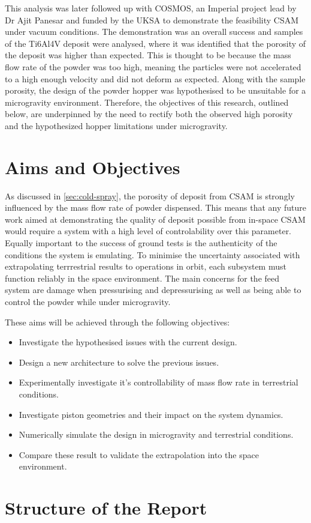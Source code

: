 This analysis was later followed up with COSMOS, an Imperial project lead by Dr Ajit Panesar and funded by the UKSA to demonstrate the feasibility CSAM under vacuum conditions. The demonstration was an overall success and samples of the Ti6Al4V deposit were analysed, where it was identified that the porosity of the deposit was higher than expected. This is thought to be because the mass flow rate of the powder was too high, meaning the particles were not accelerated to a high enough velocity and did not deform as expected. Along with the sample porosity, the design of the powder hopper was hypothesised to be unsuitable for a microgravity environment. Therefore, the objectives of this research, outlined below, are underpinned by the need to rectify both the observed high porosity and the hypothesized hopper limitations under microgravity.

\section{Aims and Objectives}
As discussed in \autoref{sec:cold-spray}, the porosity of deposit from CSAM is strongly influenced by the mass flow rate of powder dispensed. This means that any future work aimed at demonstrating the quality of deposit possible from in-space CSAM would require a system with a high level of controlability over this parameter. Equally important to the success of ground tests is the authenticity of the conditions the system is emulating. To minimise the uncertainty associated with extrapolating terrrestrial results to operations in orbit, each subsystem must function reliably in the space environment. The main concerns for the feed system are damage when pressurising and depressurising as well as being able to control the powder while under microgravity.

These aims will be achieved through the following objectives:
\begin{itemize}
    \item Investigate the hypothesised issues with the current design.
    \item Design a new architecture to solve the previous issues.
    \item Experimentally investigate it's controllability of mass flow rate in terrestrial conditions.
    \item Investigate piston geometries and their impact on the system dynamics.
    \item Numerically simulate the design in microgravity and terrestrial conditions.
    \item Compare these result to validate the extrapolation into the space environment. 
\end{itemize}


\section{Structure of the Report}
